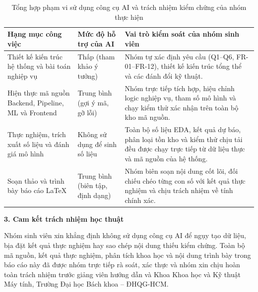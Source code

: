 \begin{table}[H]
	\centering
	\small
	\begin{tabular}{p{4.5cm} p{4.2cm} p{6.8cm}}
		\toprule
		\textbf{Hạng mục công việc} & \textbf{Mức độ hỗ trợ của AI} & \textbf{Vai trò kiểm soát của nhóm sinh viên} \\
		\midrule
		Thiết kế kiến trúc hệ thống và bài toán nghiệp vụ & Thấp (tham khảo ý tưởng) & Nhóm tự xác định yêu cầu (Q1--Q6, FR-01--FR-12), thiết kế kiến trúc tổng thể và các đánh đổi kỹ thuật. \\
		Hiện thực mã nguồn Backend, Pipeline, ML và Frontend & Trung bình (gợi ý mã, gỡ lỗi) & Nhóm trực tiếp tích hợp, hiệu chỉnh logic nghiệp vụ, tham số mô hình và chạy kiểm thử xác nhận trên toàn bộ kho mã nguồn. \\
		Thực nghiệm, trích xuất số liệu và đánh giá mô hình & Không sử dụng để sinh số liệu & Toàn bộ số liệu EDA, kết quả dự báo, phân loại tồn kho và kiểm thử chịu tải đều được chạy trực tiếp từ dữ liệu thực và mã nguồn của hệ thống. \\
		Soạn thảo và trình bày báo cáo \LaTeX{} & Trung bình (biên tập, định dạng) & Nhóm biên soạn nội dung cốt lõi, đối chiếu chéo từng con số với kết quả thực nghiệm và chịu trách nhiệm về tính chính xác. \\
		\bottomrule
	\end{tabular}
	\caption{Tổng hợp phạm vi sử dụng công cụ AI và trách nhiệm kiểm chứng của nhóm thực hiện}
	\label{tab:ai-use-statement}
\end{table}

\medskip
\noindent\textbf{3. Cam kết trách nhiệm học thuật}

Nhóm sinh viên xin khẳng định không sử dụng công cụ AI để ngụy tạo dữ liệu, bịa đặt kết quả thực nghiệm hay sao chép nội dung thiếu kiểm chứng. Toàn bộ mã nguồn, kết quả thực nghiệm, phân tích khoa học và nội dung trình bày trong báo cáo này đã được nhóm trực tiếp rà soát, xác thực và nhóm xin chịu hoàn toàn trách nhiệm trước giảng viên hướng dẫn và Khoa Khoa học và Kỹ thuật Máy tính, Trường Đại học Bách khoa -- ĐHQG-HCM.
